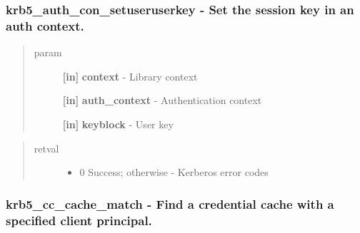 \documentclass[letterpaper,10pt,english]{sphinxmanual}
\begin{document}
\subsubsection{krb5\_auth\_con\_setuseruserkey -  Set the session key in an auth context.}
\label{appdev/refs/api/krb5_auth_con_setuseruserkey::doc}\label{appdev/refs/api/krb5_auth_con_setuseruserkey:krb5-auth-con-setuseruserkey-set-the-session-key-in-an-auth-context}

\begin{fulllineitems}
\label{appdev/refs/api/krb5_auth_con_setuseruserkey:c.krb5_auth_con_setuseruserkey}
\end{fulllineitems}

\begin{quote}\begin{description}
\item[{param}] \leavevmode
\textbf{{[}in{]}} \textbf{context} - Library context

\textbf{{[}in{]}} \textbf{auth\_context} - Authentication context

\textbf{{[}in{]}} \textbf{keyblock} - User key

\end{description}\end{quote}
\begin{quote}\begin{description}
\item[{retval}] \leavevmode\begin{itemize}
\item {} 
0   Success; otherwise - Kerberos error codes

\end{itemize}

\end{description}\end{quote}


\subsubsection{krb5\_cc\_cache\_match -  Find a credential cache with a specified client principal.}
\label{appdev/refs/api/krb5_cc_cache_match:krb5-cc-cache-match-find-a-credential-cache-with-a-specified-client-principal}\label{appdev/refs/api/krb5_cc_cache_match::doc}
\end{document}
